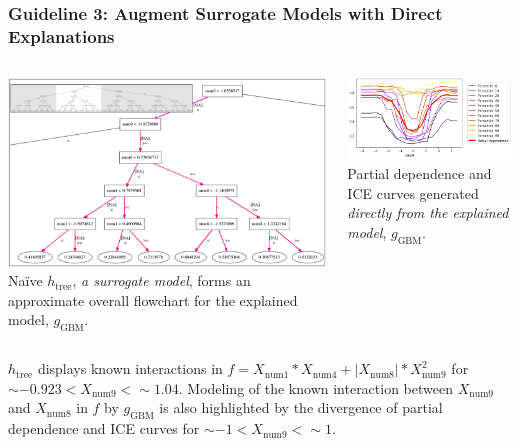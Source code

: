 \documentclass[11pt,
               aspectratio=169,
               hyperref={colorlinks}
               ]{beamer}
\begin{document}
	\begin{frame}[t]
	
		\frametitle{\textbf{Guideline 3}: Augment Surrogate Models with Direct Explanations}	
	
		\begin{columns}
				
			\centering			
			\includegraphics[height=0.6\linewidth, width=.95\linewidth]{img/figure_3-eps-converted-to.png}\\
  			\tiny{Na\"ive $h_{\text{tree}}$, \textit{a surrogate model}, forms an approximate overall flowchart for the explained model, $g_{\text{GBM}}$.}

			\hspace{5pt}
  			\includegraphics[height=.52\linewidth, width=1.02\linewidth]{img/figure_4.png}\\
  			\tiny{Partial dependence and ICE curves generated \textit{directly from the explained model}, $g_{\text{GBM}}$.}
  			
  		\end{columns}

	\scriptsize{$h_{\text{tree}}$ displays known interactions in $f = X_{\text{num}1} * X_{\text{num}4} + |X_{\text{num}8}| * X_{\text{num}9}^2$ for $\sim -0.923 < X_{\text{num9}} <  \sim 1.04$. Modeling of the known interaction between $X_{\text{num9}}$ and $X_{\text{num8}}$ in $f$ by $g_{\text{GBM}}$ is also highlighted by the divergence of partial dependence and ICE curves for $\sim -1 < X_{\text{num9}} <  \sim 1$.}

	\end{frame}
\end{document}
